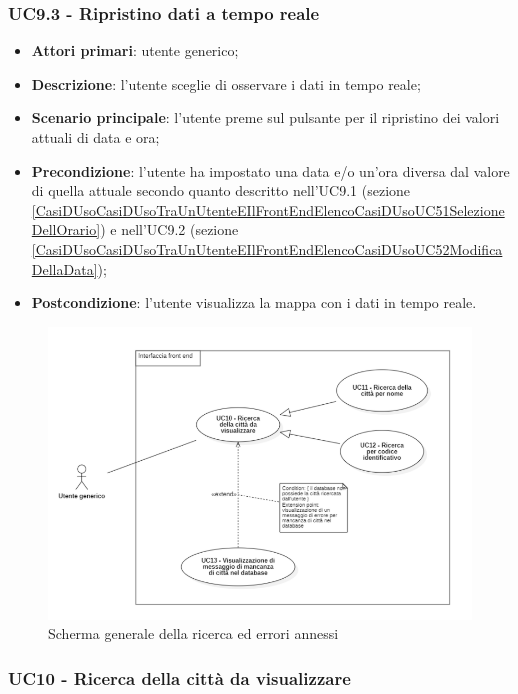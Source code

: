 \subsubsection{UC9.3 - Ripristino dati a tempo reale}\label{CasiDUsoCasiDUsoTraUnUtenteEIlFrontEndElencoCasiDUsoUC53RipristinoDatiATempoReale}
\begin{itemize}
	\item \textbf{Attori primari}: utente generico;
	\item \textbf{Descrizione}: l’utente sceglie di osservare i dati in tempo reale;
	\item \textbf{Scenario principale}: l’utente preme sul pulsante per il ripristino dei valori attuali di data e ora;
	\item \textbf{Precondizione}: l’utente ha impostato una data e/o un’ora diversa dal valore di quella attuale secondo quanto descritto nell'UC9.1 (sezione \ref{CasiDUsoCasiDUsoTraUnUtenteEIlFrontEndElencoCasiDUsoUC51SelezioneDellOrario}) e nell'UC9.2 (sezione \ref{CasiDUsoCasiDUsoTraUnUtenteEIlFrontEndElencoCasiDUsoUC52ModificaDellaData});
	\item \textbf{Postcondizione}: l’utente visualizza la mappa con i dati in tempo reale.
\end{itemize}


\begin{center}
	\begin{figure}[H]
		\centering\includegraphics[scale=0.6]{../immagini/attori_casi/UC_10.png}
		\caption{Scherma generale della ricerca ed errori annessi}
	\end{figure}
\end{center}


\subsubsection{UC10 - Ricerca della città da visualizzare}\label{CasiDUsoCasiDUsoTraUnUtenteEIlFrontEndElencoCasiDUsoUC6RicercaDellaCittàDaVisualizzare}


